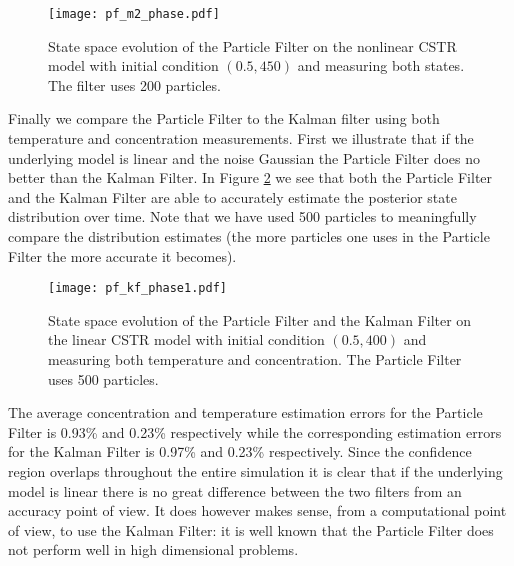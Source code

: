 \begin{figure}[H] 
\centering
\texttt{[image: pf\_m2\_phase.pdf]}
\caption{State space evolution of the Particle Filter on the nonlinear CSTR model with initial condition $(0.5, 450)$ and measuring both states. The filter uses 200 particles.}
\label{fig_pf_m2_phase}
\end{figure}
Finally we compare the Particle Filter to the Kalman filter using both temperature and concentration measurements. First we illustrate that if the underlying model is linear and the noise Gaussian the Particle Filter does no better than the Kalman Filter. In Figure \ref{fig_pf_kf_phase1} we see that both the Particle Filter and the Kalman Filter are able to accurately estimate the posterior state distribution over time. Note that we have used 500 particles to meaningfully compare the distribution estimates (the more particles one uses in the Particle Filter the more accurate it becomes).
\begin{figure}[H] 
\centering
\texttt{[image: pf\_kf\_phase1.pdf]}
\caption{State space evolution of the Particle Filter and the Kalman Filter on the linear CSTR model with initial condition $(0.5, 400)$ and measuring both temperature and concentration. The Particle Filter uses 500 particles.}
\label{fig_pf_kf_phase1}
\end{figure}
The average concentration and temperature estimation errors for the Particle Filter is 0.93\% and 0.23\% respectively while the corresponding estimation errors for the Kalman Filter is 0.97\% and 0.23\% respectively. Since the confidence region overlaps throughout the entire simulation it is clear that if the underlying model is linear there is no great difference between the two filters from an accuracy point of view. It does however makes sense, from a computational point of view, to use the Kalman Filter: it is well known that the Particle Filter does not perform well in high dimensional problems\cite{snyder}. 


